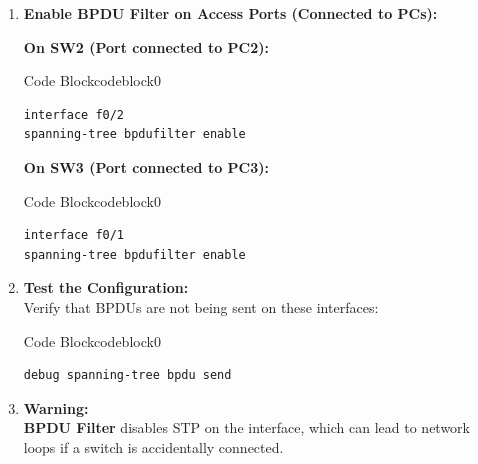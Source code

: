 \documentclass[a4paper]{book}
\begin{document}
\begin{enumerate}
	\item \textbf{Enable BPDU Filter on Access Ports (Connected to PCs):}

	      \textbf{On SW2 (Port connected to PC2):}



	      \begin{ocg}{Code Block}{codeblock}{0}
		      \vspace{0.5cm}
		      \begin{lstlisting}
interface f0/2
spanning-tree bpdufilter enable
            \end{lstlisting}
	      \end{ocg}


	      \textbf{On SW3 (Port connected to PC3):}



	      \begin{ocg}{Code Block}{codeblock}{0}
		      \vspace{0.5cm}
		      \begin{lstlisting}
interface f0/1
spanning-tree bpdufilter enable
\end{lstlisting}
	      \end{ocg}

	\item \textbf{Test the Configuration:} \\
	      Verify that BPDUs are not being sent on these interfaces:



	      \begin{ocg}{Code Block}{codeblock}{0}
		      \vspace{0.5cm}
		      \begin{lstlisting}
debug spanning-tree bpdu send
    \end{lstlisting}
	      \end{ocg}

	\item \textbf{Warning:} \\
	      \textbf{BPDU Filter} disables STP on the interface, which can lead to network loops if a switch is accidentally connected.
\end{enumerate}
\end{document}
